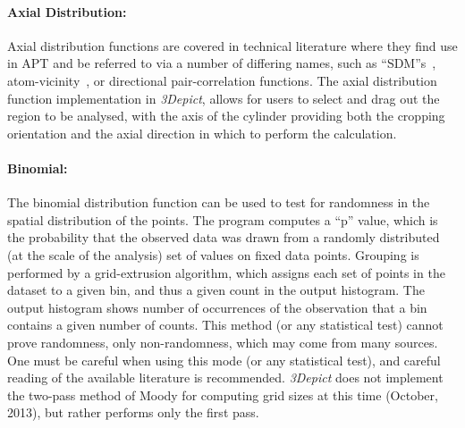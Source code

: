 \documentclass[10pt]{article}
\begin{document}
\paragraph{Axial Distribution:} Axial distribution functions are covered in technical literature where they find use in APT and be referred to via a number of differing names, such as ``SDM''s~\cite{Geiser2007}, atom-vicinity~\cite{Boll2007}, or directional pair-correlation functions. The axial distribution function implementation in \emph{3Depict}, allows for users to select and drag out the region to be analysed, with the axis of the cylinder providing both the cropping orientation and the axial direction in which to perform the calculation. 

\paragraph{Binomial:} The binomial distribution function can be used to test for randomness in the spatial distribution of the points. The program computes a ``p'' value, which is the probability that the observed data was drawn from a  randomly distributed (at the scale of the analysis) set of values on fixed data points. Grouping is performed by a grid-extrusion algorithm, which assigns each set of points in the dataset to a given bin, and thus a given count in the output histogram. The output histogram shows number of occurrences of the observation that a bin contains a given number of counts. This method (or any statistical test) cannot prove randomness, only non-randomness, which may come from many sources. One must be careful when using this mode (or any statistical test), and careful reading of the available literature is recommended. \emph{3Depict} does not implement the two-pass method of Moody for computing grid sizes at this time (October, 2013), but rather performs only the first pass.
\end{document}
